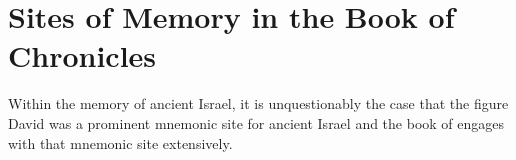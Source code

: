 
\section{Sites of Memory in the Book of Chronicles}



Within the memory of ancient Israel, it is unquestionably the case that the figure David was a prominent mnemonic site for ancient Israel and the book of \chronicles engages with that mnemonic site extensively.


